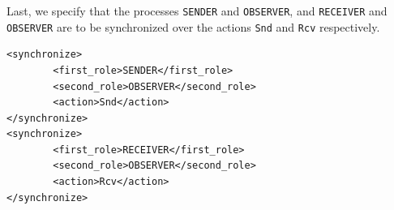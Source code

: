 Last, we specify that the processes \texttt{SENDER} and \texttt{OBSERVER}, and  \texttt{RECEIVER} and \texttt{OBSERVER} are to be synchronized over the actions \texttt{Snd} and \texttt{Rcv} respectively.

\begin{lstlisting}[frame=single]
<synchronize>
        <first_role>SENDER</first_role>
        <second_role>OBSERVER</second_role>
        <action>Snd</action>
</synchronize>
<synchronize>
        <first_role>RECEIVER</first_role>
        <second_role>OBSERVER</second_role>
        <action>Rcv</action>
</synchronize>
\end{lstlisting}
